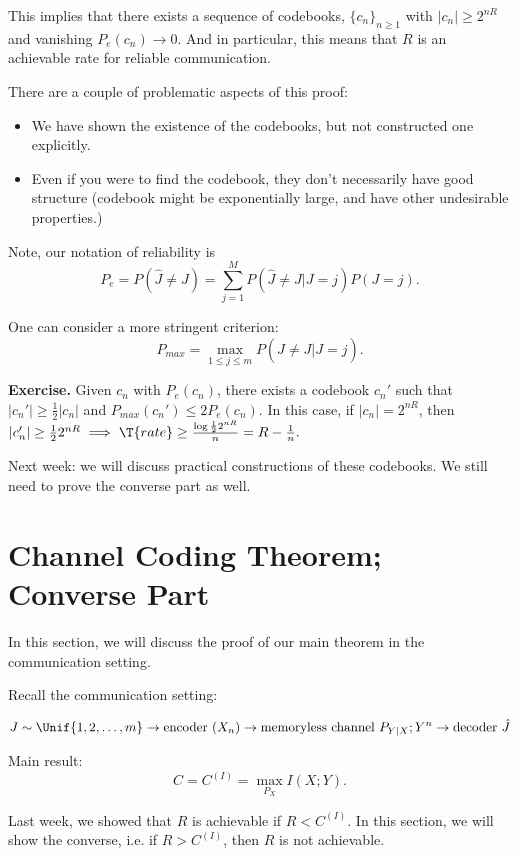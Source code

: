 This implies that there exists a sequence of codebooks, $\{ c_n \}_{n \geq 1}$ with $|c_n| \geq 2^{nR}$ and vanishing $P_e(c_n) \to 0$.  And in particular, this means that $R$ is an achievable rate for reliable communication. \ep

There are a couple of problematic aspects of this proof:

\begin{itemize}
  \item We have shown the existence of the codebooks, but not constructed one explicitly.
  \item Even if you were to find the codebook, they don't necessarily have good structure (codebook might be exponentially large, and have other undesirable properties.)
\end{itemize}

Note, our notation of reliability is
\[
  P_e = P(\hat{J} \neq J) = \sum_{j=1}^{M} P(\hat{J} \neq J | J = j) P(J = j).
\]

One can consider a more stringent criterion:
\[
  P_{max} = \max_{1 \leq j \leq m} P(\hat{J} \neq J | J = j).
\]

{\bf Exercise.} Given $c_n$ with $P_e (c_n)$, there exists a codebook $c_n'$ such that $|c_n'| \geq \frac{1}{2} |c_n|$ and $P_{max} (c_n') \leq 2 P_e (c_n)$.  In this case, if $|c_n| = 2^{nR}$, then $|c_n'| \geq \frac{1}{2} 2^{nR} \implies \T{rate} \geq \frac{\log \frac{1}{2} 2^{nR}}{n} = R - \frac{1}{n}.$

Next week: we will discuss practical constructions of these codebooks.  We still need to prove the converse part as well.


\section{Channel Coding Theorem; Converse Part}

In this section, we will discuss the proof of our main theorem in the communication setting.

Recall the communication setting:

\[
  J \sim \Unif\{1, 2, \dots, m \} \to \text{encoder $(X_n)$} \to \text{memoryless channel $P_{Y|X}; Y^n$} \to \text{decoder $\hat{J}$} 
\]

Main result:
\[
  C = C^{(I)} = \max_{P_X} I(X; Y).
\]

Last week, we showed that $R$ is achievable if $R < C^{(I)}$.  In this section, we will show the converse, i.e. if $R > C^{(I)}$, then $R$ is not achievable.

